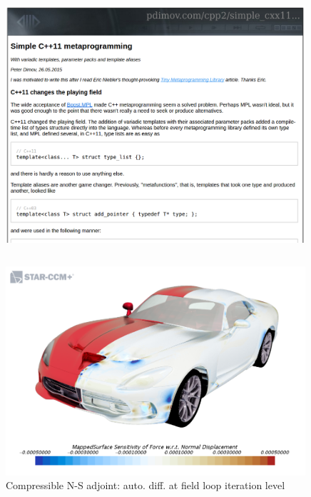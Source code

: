 \documentclass[xcolor=dvipsnames]{beamer}
\begin{document}
\begin{frame}[plain]
  \begin{columns}[T] %
    \begin{column}{0.9\textwidth}
      \begin{figure}[H]
        \centering
        \includegraphics[width=0.99\textwidth]{pdimov}
      \end{figure}
    \end{column}%
  \end{columns}
\end{frame}


\begin{frame}[plain]
      \begin{figure}[H]
        \centering
        \includegraphics[width=0.99\textwidth]{jag_surf_opt}
        \caption{Compressible N-S adjoint: auto. diff. at field loop iteration level}
      \end{figure}
\end{frame}
\end{document}
